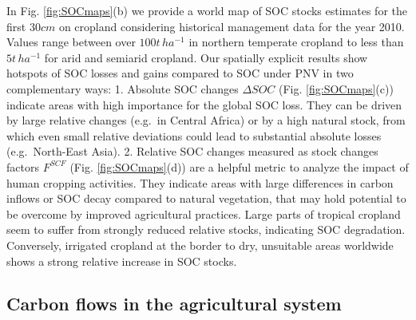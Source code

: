 \documentclass[gc, manuscript]{copernicus}
\begin{document}
In Fig. \ref{fig:SOCmaps}(b) we provide a world map of SOC stocks estimates for the first \(30\unit{cm}\) on cropland considering historical management data for the year 2010. Values range between over \(100\unit{t\,ha^{-1}}\) in northern temperate cropland to less than \(5\unit{t\,ha^{-1}}\) for arid and semiarid cropland.
Our spatially explicit results show hotspots of SOC losses and gains compared to SOC under PNV in two complementary ways:
1. Absolute SOC changes \(\Delta SOC\) (Fig. \ref{fig:SOCmaps}(c)) indicate areas with high importance for the global SOC loss. They can be driven by large relative changes (e.g.~in Central Africa) or by a high natural stock, from which even small relative deviations could lead to substantial absolute losses (e.g.~North-East Asia).
2. Relative SOC changes measured as stock changes factors \(F^{SCF}\) (Fig. \ref{fig:SOCmaps}(d)) are a helpful metric to analyze the impact of human cropping activities. They indicate areas with large differences in carbon inflows or SOC decay compared to natural vegetation, that may hold potential to be overcome by improved agricultural practices. Large parts of tropical cropland seem to suffer from strongly reduced relative stocks, indicating SOC degradation. Conversely, irrigated cropland at the border to dry, unsuitable areas worldwide shows a strong relative increase in SOC stocks.

\hypertarget{carbon-flows-in-the-agricultural-system}{%
\subsection{Carbon flows in the agricultural system}\label{carbon-flows-in-the-agricultural-system}}
\end{document}
